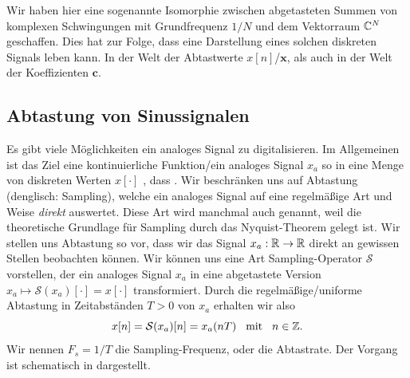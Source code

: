 Wir haben hier eine sogenannte Isomorphie zwischen abgetasteten Summen von komplexen Schwingungen mit Grundfrequenz $1/N$ und dem Vektorraum $\mathbb{C}^N$ geschaffen.
Dies hat zur Folge, dass eine Darstellung eines solchen diskreten Signals  leben kann. 
In der Welt der Abtastwerte $x[n]$/$\bm x$, als auch in der Welt der Koeffizienten $\bm c$.
%
%
%
\subsection{Abtastung von Sinussignalen}\label{sec:sample_harm}
%
Es gibt viele Möglichkeiten ein analoges Signal zu digitalisieren.
Im Allgemeinen ist das Ziel eine kontinuierliche Funktion/ein analoges Signal $x_a$ so in eine Menge von diskreten Werten $x[\cdot]$ , dass .
Wir beschränken uns auf Abtastung (denglisch: Sampling), welche ein analoges Signal auf eine regelmäßige Art und Weise \emph{direkt} auswertet.
Diese Art wird manchmal auch  genannt, weil die theoretische Grundlage für  Sampling durch das Nyquist-Theorem gelegt ist.
Wir stellen uns Abtastung so vor, dass wir das Signal $x_a: \mathbb{R} \rightarrow \mathbb{R}$ direkt an gewissen Stellen beobachten können.
Wir können uns eine Art Sampling-Operator $\mathcal{S}$ vorstellen, der ein analoges Signal $x_a$ in eine abgetastete Version $x_a \mapsto \mathcal{S}(x_a)[\cdot] = x[\cdot]$ transformiert.
Durch die regelmäßige/uniforme Abtastung in Zeitabständen $T > 0$ von $x_a$ erhalten wir also
\[
    x[n] = \mathcal{S}(x_a)[n] = x_a(n T) {\hspace{3mm} \text{mit} \hspace{3mm}} n \in \mathbb{Z}.
\]
Wir nennen $F_s = 1/T$ die Sampling-Frequenz, oder die Abtastrate.
Der Vorgang ist schematisch in  dargestellt.

